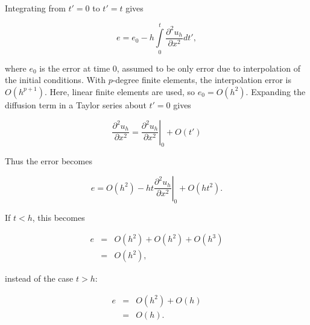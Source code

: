 \documentclass{article}
\begin{document}
\noindent Integrating from $t'=0$ to $t'=t$ gives

\begin{equation}
  e = e_0 -h\int\limits_0^t\frac{\partial^2 u_h}{\partial x^2}dt',
\end{equation}

\noindent where $e_0$ is the error at time 0, assumed to be only error due to interpolation
of the initial conditions. With $p$-degree finite elements, the interpolation error
is $O(h^{p+1})$. Here, linear finite elements are used, so $e_0=O(h^2)$. 
Expanding the diffusion term in a Taylor series
about $t'=0$ gives

\[
  \frac{\partial^2 u_h}{\partial x^2} = \left.\frac{\partial^2 u_h}{\partial x^2}\right|_0
    + O(t')
\]

\noindent Thus the error becomes

\[
  e = O(h^2) -h t\left.\frac{\partial^2 u_h}{\partial x^2}\right|_0 + O(h t^2).
\]

\noindent If $t<h$, this becomes

\begin{eqnarray*}
  e & = & O(h^2) + O(h^2) + O(h^3)\\
    & = & O(h^2),
\end{eqnarray*}

\noindent instead of the case $t>h$:

\begin{eqnarray*}
  e & = & O(h^2) + O(h)\\
    & = & O(h).
\end{eqnarray*}
\end{document}
